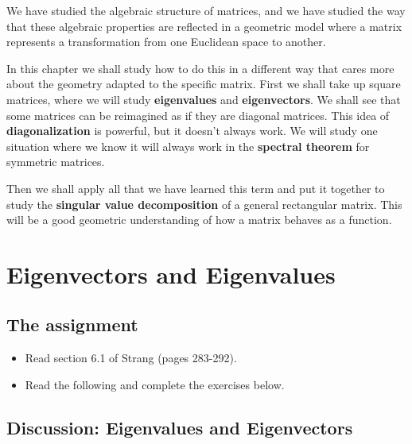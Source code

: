 \documentclass[10pt,]{book}
\newcommand{\terminology}[1]{\textbf{#1}}
\theoremstyle{plain}
\theoremstyle{definition}
\numberwithin{equation}{section}
\begin{document}
      We have studied the algebraic structure of matrices, and we have studied the
      way that these algebraic properties are reflected in a geometric model where
      a matrix represents a transformation from one Euclidean space to another.
\par

      In this chapter we shall study how to do this in a different way that cares
      more about the geometry adapted to the specific matrix. First we shall take
      up square matrices, where we will study \terminology{eigenvalues} and
      \terminology{eigenvectors}. We shall see that some matrices can be reimagined
      as if they are diagonal matrices. This idea of \terminology{diagonalization}
      is powerful, but it doesn't always work. We will study one situation where
      we know it will always work in the \terminology{spectral theorem} for symmetric
      matrices.
\par

      Then we shall apply all that we have learned this term and put it together
      to study the \terminology{singular value decomposition} of a general rectangular
      matrix. This will be a good geometric understanding of how a matrix behaves
      as a function.
\typeout{************************************************}
\typeout{************************************************}
\section[Eigenvectors and Eigenvalues]{Eigenvectors and Eigenvalues}\label{section-eigenvectors}
\typeout{************************************************}
\typeout{************************************************}
\subsection[The assignment]{The assignment}\label{subsection-126}
\begin{itemize}
\item{}Read section 6.1 of Strang (pages 283-292).\item{}Read the following and complete the exercises below.\end{itemize}
\typeout{************************************************}
\typeout{************************************************}
\subsection[Discussion: Eigenvalues and Eigenvectors]{Discussion: Eigenvalues and Eigenvectors}\label{subsection-127}
\end{document}
